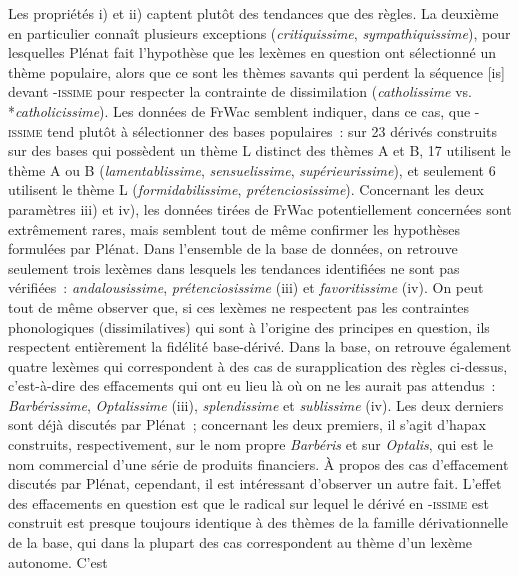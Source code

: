 \documentclass[output=paper]{langsci/langscibook}
\begin{document}
Les propriétés i) et ii) captent plutôt des tendances que des règles. La
deuxième en particulier connaît plusieurs exceptions
(\emph{critiquissime}, \emph{sympathiquissime}), pour lesquelles Plénat
fait l'hypothèse que les lexèmes en question ont sélectionné un thème
populaire, alors que ce sont les thèmes savants qui perdent la séquence
{[}is{]} devant -\textsc{issime} pour respecter la contrainte de
dissimilation (\emph{catholissime} vs. *\emph{catholicissime}). Les
données de FrWac semblent indiquer, dans ce cas, que -\textsc{issime}
tend plutôt à sélectionner des bases populaires~: sur 23 dérivés
construits sur des bases qui possèdent un thème L distinct des thèmes A
et B, 17 utilisent le thème A ou B (\emph{lamentablissime},
\emph{sensuelissime}, \emph{supérieurissime}), et seulement 6 utilisent
le thème L (\emph{formidabilissime}, \emph{prétenciosissime}).
Concernant les deux paramètres iii) et iv), les données tirées de FrWac
potentiellement concernées sont extrêmement rares, mais semblent tout de
même confirmer les hypothèses formulées par Plénat. Dans l'ensemble de
la base de données, on retrouve seulement trois lexèmes dans lesquels
les tendances identifiées ne sont pas vérifiées~: \emph{andalousissime},
\emph{prétenciosissime} (iii) et \emph{favoritissime} (iv). On peut tout
de même observer que, si ces lexèmes ne respectent pas les contraintes
phonologiques (dissimilatives) qui sont à l'origine des principes en
question, ils respectent entièrement la fidélité base-dérivé. Dans la
base, on retrouve également quatre lexèmes qui correspondent à des cas
de surapplication des règles ci-dessus, c'est-à-dire des effacements qui
ont eu lieu là où on ne les aurait pas attendus~: \emph{Barbérissime},
\emph{Optalissime} (iii), \emph{splendissime} et \emph{sublissime} (iv).
Les deux derniers sont déjà discutés par Plénat~; concernant les deux
premiers, il s'agit d'hapax construits, respectivement, sur le nom
propre \emph{Barbéris} et sur \emph{Optalis}, qui est le nom commercial
d'une série de produits financiers. À propos des cas d'effacement
discutés par Plénat, cependant, il est intéressant d'observer un autre
fait. L'effet des effacements en question est que le radical sur lequel
le dérivé en -\textsc{issime} est construit est presque toujours
identique à des thèmes de la famille dérivationnelle de la base, qui
dans la plupart des cas correspondent au thème d'un lexème autonome. C'est
\end{document}
